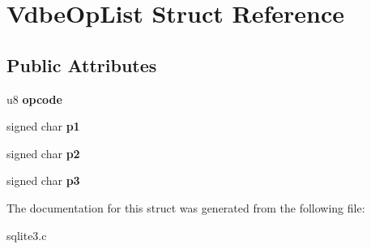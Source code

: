 \hypertarget{struct_vdbe_op_list}{\section{Vdbe\-Op\-List Struct Reference}
\label{struct_vdbe_op_list}
}
\subsection*{Public Attributes}
\begin{DoxyCompactItemize}
\item 
\hypertarget{struct_vdbe_op_list_a9c839a619aed99f91cb5e226487be7be}{u8 {\bfseries opcode}}\label{struct_vdbe_op_list_a9c839a619aed99f91cb5e226487be7be}

\item 
\hypertarget{struct_vdbe_op_list_a68641ef4313dfdfafe45b75203c49d5a}{signed char {\bfseries p1}}\label{struct_vdbe_op_list_a68641ef4313dfdfafe45b75203c49d5a}

\item 
\hypertarget{struct_vdbe_op_list_a8493431402f7f91cea81c00e311dc4e1}{signed char {\bfseries p2}}\label{struct_vdbe_op_list_a8493431402f7f91cea81c00e311dc4e1}

\item 
\hypertarget{struct_vdbe_op_list_a584cdaa02042fd5d1bc8cffbdfd9441d}{signed char {\bfseries p3}}\label{struct_vdbe_op_list_a584cdaa02042fd5d1bc8cffbdfd9441d}

\end{DoxyCompactItemize}


The documentation for this struct was generated from the following file\-:\begin{DoxyCompactItemize}
\item 
sqlite3.\-c\end{DoxyCompactItemize}
